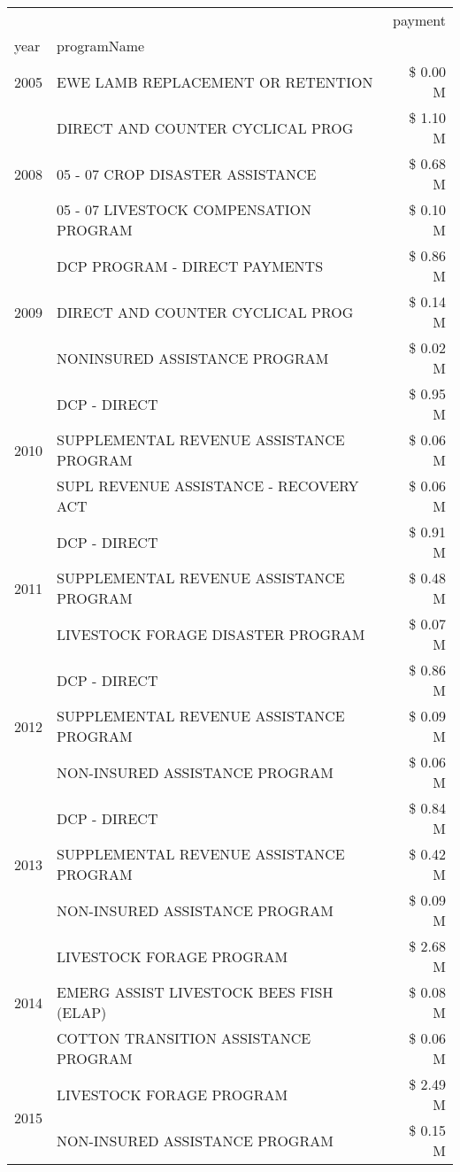 \begin{tabular}{llr}
\toprule
 &  & payment \\
year & programName &  \\
\midrule
2005 & EWE LAMB REPLACEMENT OR RETENTION & \$ 0.00 M \\
\cline{1-3}
\multirow[t]{3}{*}{2008} & DIRECT AND COUNTER CYCLICAL PROG & \$ 1.10 M \\
 & 05 - 07 CROP DISASTER ASSISTANCE & \$ 0.68 M \\
 & 05 - 07 LIVESTOCK COMPENSATION PROGRAM & \$ 0.10 M \\
\cline{1-3}
\multirow[t]{3}{*}{2009} & DCP PROGRAM - DIRECT PAYMENTS & \$ 0.86 M \\
 & DIRECT AND COUNTER CYCLICAL PROG & \$ 0.14 M \\
 & NONINSURED ASSISTANCE PROGRAM & \$ 0.02 M \\
\cline{1-3}
\multirow[t]{3}{*}{2010} & DCP - DIRECT & \$ 0.95 M \\
 & SUPPLEMENTAL REVENUE ASSISTANCE PROGRAM & \$ 0.06 M \\
 & SUPL REVENUE ASSISTANCE - RECOVERY ACT & \$ 0.06 M \\
\cline{1-3}
\multirow[t]{3}{*}{2011} & DCP - DIRECT & \$ 0.91 M \\
 & SUPPLEMENTAL REVENUE ASSISTANCE PROGRAM & \$ 0.48 M \\
 & LIVESTOCK FORAGE DISASTER PROGRAM & \$ 0.07 M \\
\cline{1-3}
\multirow[t]{3}{*}{2012} & DCP - DIRECT & \$ 0.86 M \\
 & SUPPLEMENTAL REVENUE ASSISTANCE PROGRAM & \$ 0.09 M \\
 & NON-INSURED ASSISTANCE PROGRAM & \$ 0.06 M \\
\cline{1-3}
\multirow[t]{3}{*}{2013} & DCP - DIRECT & \$ 0.84 M \\
 & SUPPLEMENTAL REVENUE ASSISTANCE PROGRAM & \$ 0.42 M \\
 & NON-INSURED ASSISTANCE PROGRAM & \$ 0.09 M \\
\cline{1-3}
\multirow[t]{3}{*}{2014} & LIVESTOCK FORAGE PROGRAM & \$ 2.68 M \\
 & EMERG ASSIST LIVESTOCK BEES FISH (ELAP) & \$ 0.08 M \\
 & COTTON TRANSITION ASSISTANCE PROGRAM & \$ 0.06 M \\
\cline{1-3}
\multirow[t]{3}{*}{2015} & LIVESTOCK FORAGE PROGRAM & \$ 2.49 M \\
 & NON-INSURED ASSISTANCE PROGRAM & \$ 0.15 M \\

\end{tabular}
